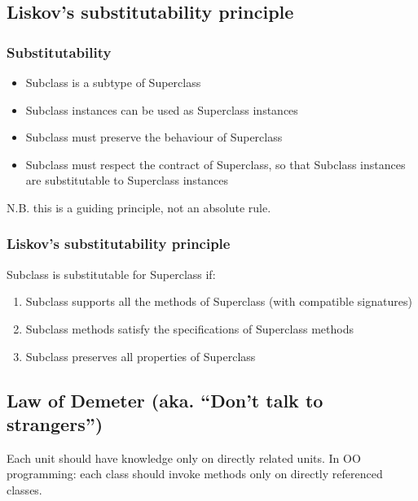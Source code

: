 \subsection{Liskov’s substitutability principle}

\begin{figure}[!ht]
    \centering
    
\end{figure}

\subsubsection{Substitutability}

\begin{itemize}
    \item Subclass is a subtype of Superclass
    \item Subclass instances can be used as Superclass instances
    \item Subclass must preserve the behaviour of Superclass
    \item Subclass must respect the contract of Superclass, so that Subclass instances are substitutable to Superclass instances
\end{itemize}

N.B. this is a guiding principle, not an absolute rule. \newline

\subsubsection{Liskov’s substitutability principle}

Subclass is substitutable for Superclass if:

\begin{enumerate}
    \item Subclass supports all the methods of Superclass (with compatible signatures)
    \item Subclass methods satisfy the specifications of Superclass methods
    \item Subclass preserves all properties of Superclass
\end{enumerate}

\subsection{Law of Demeter (aka. \enquote{Don't talk to strangers})}

Each unit should have knowledge only on directly related units. \newline
In OO programming: each class should invoke methods only on directly referenced classes.


